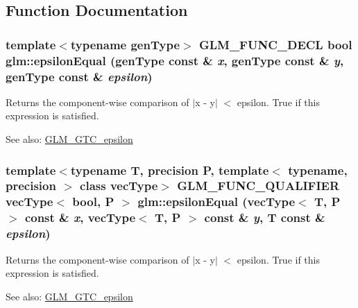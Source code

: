 \subsection{Function Documentation}
\hypertarget{group__gtc__epsilon_g98e0b3362c11f76fc16f5fa9b27435d8}{
\subsubsection[epsilonEqual]{\setlength{\rightskip}{0pt plus 5cm}template$<$typename genType$>$ GLM\_\-FUNC\_\-DECL bool glm::epsilonEqual (genType const \& {\em x}, \/  genType const \& {\em y}, \/  genType const \& {\em epsilon})}}
\label{group__gtc__epsilon_g98e0b3362c11f76fc16f5fa9b27435d8}


Returns the component-wise comparison of $|$x - y$|$ $<$ epsilon. True if this expression is satisfied.

\begin{Desc}
\item[See also:]\hyperlink{group__gtc__epsilon}{GLM\_\-GTC\_\-epsilon} \end{Desc}
\hypertarget{group__gtc__epsilon_g7051ff93341ffb11d864e88d4bc0e3d8}{
\subsubsection[epsilonEqual]{\setlength{\rightskip}{0pt plus 5cm}template$<$typename T, precision P, template$<$ typename, precision $>$ class vecType$>$ GLM\_\-FUNC\_\-QUALIFIER vecType$<$ bool, P $>$ glm::epsilonEqual (vecType$<$ T, P $>$ const \& {\em x}, \/  vecType$<$ T, P $>$ const \& {\em y}, \/  T const \& {\em epsilon})}}
\label{group__gtc__epsilon_g7051ff93341ffb11d864e88d4bc0e3d8}


Returns the component-wise comparison of $|$x - y$|$ $<$ epsilon. True if this expression is satisfied.

\begin{Desc}
\item[See also:]\hyperlink{group__gtc__epsilon}{GLM\_\-GTC\_\-epsilon} \end{Desc}


